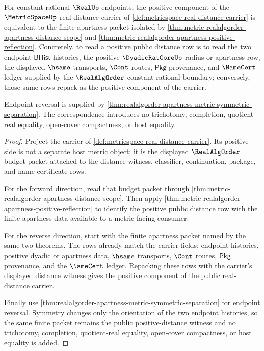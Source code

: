 \begin{theorem}
\label{thm:metricspace-realalgorder-positive-distance-public-correspondence}
For constant-rational $\RealUp$ endpoints, the positive component of the
$\MetricSpaceUp$ real-distance carrier of
\autoref{def:metricspace-real-distance-carrier} is equivalent to the finite
apartness packet isolated by
\autoref{thm:metric-realalgorder-apartness-distance-scope} and
\autoref{thm:metric-realalgorder-apartness-positive-reflection}. Concretely,
to read a positive public distance row is to read the two endpoint
$\mathsf{BHist}$ histories, the positive $\DyadicRatCoreUp$ radius or
apartness row, the displayed $\hsame$ transports, $\Cont$ routes,
$\mathsf{Pkg}$ provenance, and $\NameCert$ ledger supplied by the
$\RealAlgOrder$ constant-rational boundary; conversely, those same rows repack
as the positive component of the carrier.

Endpoint reversal is supplied by
\autoref{thm:realalgorder-apartness-metric-symmetric-separation}. The
correspondence introduces no trichotomy, completion, quotient-real equality,
open-cover compactness, or host equality.
\end{theorem}
\begin{proof}
Project the carrier of \autoref{def:metricspace-real-distance-carrier}. Its
positive side is not a separate host metric object; it is the displayed
$\RealAlgOrder$ budget packet attached to the distance witness, classifier,
continuation, package, and name-certificate rows.

For the forward direction, read that budget packet through
\autoref{thm:metric-realalgorder-apartness-distance-scope}. Then apply
\autoref{thm:metric-realalgorder-apartness-positive-reflection} to identify
the positive public distance row with the finite apartness data available to a
metric-facing consumer.

For the reverse direction, start with the finite apartness packet named by the
same two theorems. The rows already match the carrier fields: endpoint
histories, positive dyadic or apartness data, $\hsame$ transports, $\Cont$
routes, $\mathsf{Pkg}$ provenance, and the $\NameCert$ ledger. Repacking these
rows with the carrier's displayed distance witness gives the positive
component of the public real-distance carrier.

Finally use
\autoref{thm:realalgorder-apartness-metric-symmetric-separation} for endpoint
reversal. Symmetry changes only the orientation of the two endpoint histories,
so the same finite packet remains the public positive-distance witness and no
trichotomy, completion, quotient-real equality, open-cover compactness, or host
equality is added.
\end{proof}

